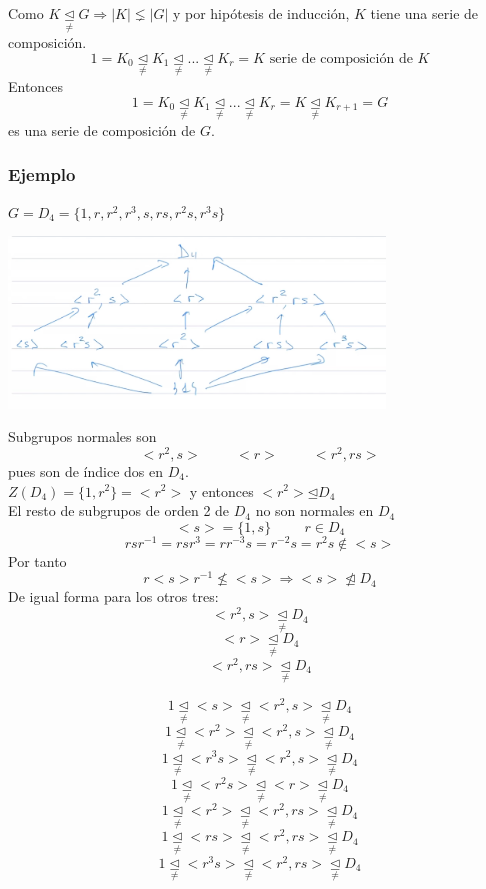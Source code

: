 \documentclass[11pt,a4paper]{article}
\begin{document}
Como $K \underset{\neq}{\unlhd} G \Rightarrow |K| \lneq |G|$ y por hipótesis de inducción, $K$ tiene una serie de composición.
$$1 = K_{0} \underset{\neq}{\unlhd} K_{1} \underset{\neq}{\unlhd} ... \underset{\neq}{\unlhd} K_{r} = K \text{ serie de composición de } K$$
Entonces
$$1 = K_{0} \underset{\neq}{\unlhd} K_{1} \underset{\neq}{\unlhd} ... \underset{\neq}{\unlhd} K_{r} = K \underset{\neq}{\unlhd} K_{r+1} = G$$
es una serie de composición de $G$.

\subsubsection*{Ejemplo}

$G = D_{4} = \{1, r, r^{2}, r^{3}, s, rs, r^{2}s, r^{3}s\}$

\begin{center}
\includegraphics[width=0.75\textwidth]{./Tema5_1}\par\vspace{1cm}
\end{center}

Subgrupos normales son
$$<r^{2},s> \hspace{1cm} <r> \hspace{1cm} <r^{2},rs>$$
pues son de índice dos en $D_{4}$. \\
$Z(D_{4}) = \{1,r^{2}\} = <r^{2}>$ y entonces $<r^{2}> \unlhd D_{4}$ \\
El resto de subgrupos de orden 2 de $D_{4}$ no son normales en $D_{4}$
$$<s> = \{1, s\} \hspace{1cm} r \in D_{4}$$
$$rsr^{-1} = rsr^{3} = rr^{-3}s = r^{-2}s = r^{2}s \notin <s>$$
Por tanto
$$r<s>r^{-1} \nleq <s> \Rightarrow <s> \ntrianglelefteq D_{4}$$
De igual forma para los otros tres:
$$<r^{2},s> \underset{\neq}{\unlhd}  D_{4}$$
$$<r> \underset{\neq}{\unlhd}  D_{4}$$
$$<r^{2},rs> \underset{\neq}{\unlhd}  D_{4}$$

$$1 \underset{\neq}{\unlhd}  <s> \underset{\neq}{\unlhd}  <r^{2},s> \underset{\neq}{\unlhd}  D_{4}$$
$$1 \underset{\neq}{\unlhd}  <r^{2}> \underset{\neq}{\unlhd}  <r^{2},s> \underset{\neq}{\unlhd}  D_{4}$$
$$1 \underset{\neq}{\unlhd}  <r^{3}s> \underset{\neq}{\unlhd}  <r^{2},s> \underset{\neq}{\unlhd}  D_{4}$$
$$1 \underset{\neq}{\unlhd}  <r^{2}s> \underset{\neq}{\unlhd}  <r> \underset{\neq}{\unlhd}  D_{4}$$
$$1 \underset{\neq}{\unlhd}  <r^{2}> \underset{\neq}{\unlhd}  <r^{2},rs> \underset{\neq}{\unlhd}  D_{4}$$
$$1 \underset{\neq}{\unlhd}  <rs> \underset{\neq}{\unlhd}  <r^{2},rs> \underset{\neq}{\unlhd}  D_{4}$$
$$1 \underset{\neq}{\unlhd}  <r^{3}s> \underset{\neq}{\unlhd}  <r^{2},rs> \underset{\neq}{\unlhd}  D_{4}$$
\end{document}

